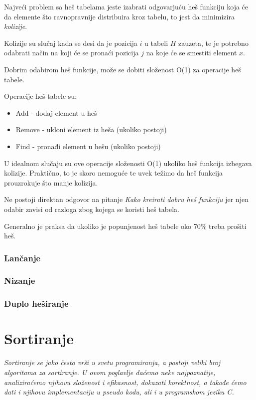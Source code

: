 \documentclass{memoir}
\begin{document}
Najveći problem sa heš tabelama jeste izabrati odgovarjuću heš funkciju koja će da elemente što ravnopravnije 
distribuira kroz tabelu, to jest da minimizira \emph{kolizije}.

Kolizije su slučaj kada se desi da je pozicija $i$ u tabeli $H$ zauzeta, te je potrebno odabrati način na koji će se 
pronaći pozicija $j$ na koje će se smestiti element $x$.

Dobrim odabirom heš funkcije, može se dobiti složenost O(1) za operacije heš tabele. 

Operacije heš tabele su:
\begin{itemize}
 \item Add - dodaj element u heš
 \item Remove - ukloni element iz heša (ukoliko postoji)
 \item Find - pronađi element u hešu (ukoliko postoji)
\end{itemize}

U idealnom slučaju su ove operacije složenosti O(1) ukoliko heš funkcija izbegava kolizije. Praktično, to je skoro 
nemoguće te uvek težimo da heš funkcija prouzrokuje što manje kolizija. 

Ne postoji direktan odgovor na pitanje \emph{Kako kreirati dobru heš funkciju} jer njen odabir zavisi od razloga zbog 
kojega se koristi heš tabela.

Generalno je praksa da ukoliko je popunjenost heš tabele oko 70$\%$ treba prošiti heš.



\subsection{Lančanje}
\subsection{Nizanje}
\subsection{Duplo heširanje}

\chapter{Sortiranje}
\emph{Sortiranje se jako često vrši u svetu programiranja, a postoji veliki broj algoritama za sortiranje. U ovom poglavlje daćemo 
neke najpoznatije, analiziraćemo njihovu složenost i efikasnost, dokazati korektnost, a takođe ćemo dati i njihovu implementaciju
u pseudo kodu, ali i u programskom jeziku C.}
\newpage
\end{document}
